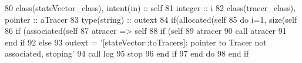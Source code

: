 \begin{DoxyCode}
80     \textcolor{keywordtype}{class}(stateVector\_class), \textcolor{keywordtype}{intent(in)} :: self
81     \textcolor{keywordtype}{integer} :: i
82     \textcolor{keywordtype}{class}(tracer\_class), \textcolor{keywordtype}{pointer} :: aTracer
83     \textcolor{keywordtype}{type}(string) :: outext
84     \textcolor{keywordflow}{if}(\textcolor{keyword}{allocated}(self%
85         \textcolor{keywordflow}{do} i=1, \textcolor{keyword}{size}(self%
86             \textcolor{keywordflow}{if} (\textcolor{keyword}{associated}(self%
87                 atracer => self%
88                 \textcolor{keywordflow}{if} (self%
89                     atracer%
90                     \textcolor{keyword}{call }atracer%
91 \textcolor{keywordflow}{                end if}
92             \textcolor{keywordflow}{else}
93                 outext = \textcolor{stringliteral}{'[stateVector::toTracers]: pointer to Tracer not associated, stoping'}
94                 \textcolor{keyword}{call }log%
95                 stop
96 \textcolor{keywordflow}{            end if}
97 \textcolor{keywordflow}{        end do}
98 \textcolor{keywordflow}{    end if}
\end{DoxyCode}
